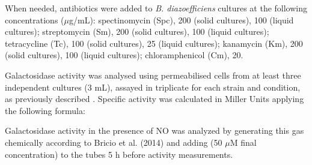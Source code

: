 \documentclass[12pt]{article}
\begin{document}
When needed, antibiotics were added to {\em B. diazoefficiens} cultures at the following
concentrations ($\mu$g/mL): spectinomycin (Spc), 200 (solid cultures), 100 (liquid cultures);
streptomycin (Sm), 200 (solid cultures), 100 (liquid cultures); tetracycline (Tc), 100 (solid
cultures), 25 (liquid cultures); kanamycin (Km), 200 (solid cultures), 100 (liquid cultures);
chloramphenicol (Cm), 20.

Galactosidase activity was analysed using permeabilised cells from at least three
independent cultures (3 mL), assayed in triplicate for each strain and condition, as previously
described \cite{cabrera2016integrated}. Specific activity was calculated in Miller Units \cite{miller1972miller} applying the following formula:

Galactosidase activity in the presence of NO was analyzed by generating this gas chemically according
to Bricio et al. (2014) \cite{bricio2014third} and adding (50 $\mu$M final concentration) to the tubes 5 h before
activity measurements.
\end{document}

